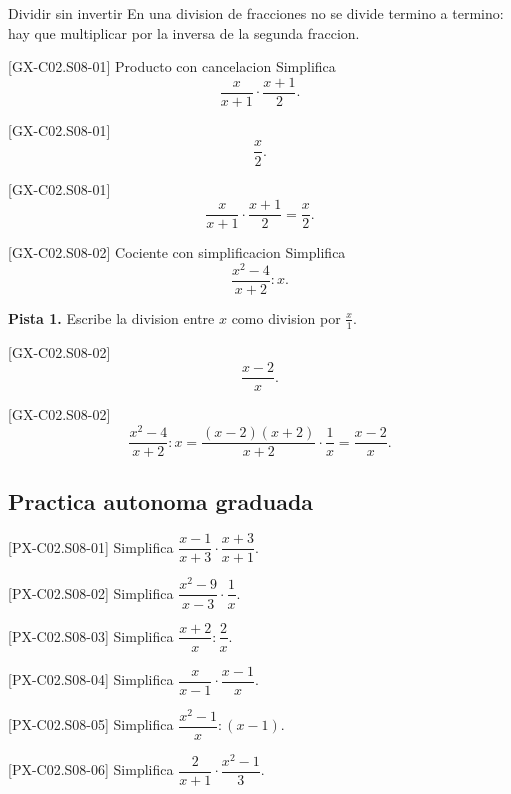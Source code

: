 \begin{commonerror}{Dividir sin invertir}
En una division de fracciones no se divide termino a termino: hay que multiplicar por la
inversa de la segunda fraccion.
\end{commonerror}

\begin{guidedexercise}{[GX-C02.S08-01] Producto con cancelacion}
Simplifica
\[
\frac{x}{x+1}\cdot \frac{x+1}{2}.
\]
\end{guidedexercise}

\begin{shortanswer}{[GX-C02.S08-01]}
\[
\frac{x}{2}.
\]
\end{shortanswer}

\begin{fullsolution}{[GX-C02.S08-01]}
\[
\frac{x}{x+1}\cdot \frac{x+1}{2}=\frac{x}{2}.
\]
\end{fullsolution}

\begin{guidedexercise}{[GX-C02.S08-02] Cociente con simplificacion}
Simplifica
\[
\frac{x^2-4}{x+2}:x.
\]

\textbf{Pista 1.} Escribe la division entre \(x\) como division por \(\frac{x}{1}\).
\end{guidedexercise}

\begin{shortanswer}{[GX-C02.S08-02]}
\[
\frac{x-2}{x}.
\]
\end{shortanswer}

\begin{fullsolution}{[GX-C02.S08-02]}
\[
\frac{x^2-4}{x+2}:x=\frac{(x-2)(x+2)}{x+2}\cdot \frac{1}{x}=\frac{x-2}{x}.
\]
\end{fullsolution}

\subsection*{Practica autonoma graduada}
\begin{exercise}{[PX-C02.S08-01] Simplifica \(\dfrac{x-1}{x+3}\cdot \dfrac{x+3}{x+1}\).}
\end{exercise}
\begin{exercise}{[PX-C02.S08-02] Simplifica \(\dfrac{x^2-9}{x-3}\cdot \dfrac{1}{x}\).}
\end{exercise}
\begin{exercise}{[PX-C02.S08-03] Simplifica \(\dfrac{x+2}{x}:\dfrac{2}{x}\).}
\end{exercise}
\begin{exercise}{[PX-C02.S08-04] Simplifica \(\dfrac{x}{x-1}\cdot \dfrac{x-1}{x}\).}
\end{exercise}
\begin{exercise}{[PX-C02.S08-05] Simplifica \(\dfrac{x^2-1}{x}:(x-1)\).}
\end{exercise}
\begin{exercise}{[PX-C02.S08-06] Simplifica \(\dfrac{2}{x+1}\cdot \dfrac{x^2-1}{3}\).}
\end{exercise}

